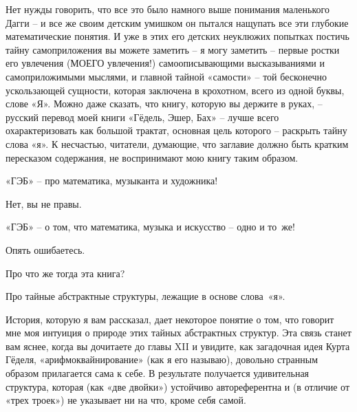 \documentclass[../main.tex]{subfiles}
\begin{document}
Нет нужды говорить, что все это было намного выше понимания маленького Дагги \--- и все же своим детским умишком он пытался нащупать все эти глубокие математические понятия. И уже в этих его детских неуклюжих попытках постичь тайну самоприложения вы можете заметить \--- я могу заметить \--- первые ростки его увлечения (МОЕГО увлечения!) самоописывающими высказываниями и самоприложимыми мыслями, и главной тайной «самости» \--- той бесконечно ускользающей сущности, которая заключена в крохотном, всего из одной буквы, слове «Я». Можно даже сказать, что книгу, которую вы держите в руках, \--- русский перевод моей книги «Гёдель, Эшер, Бах» \--- лучше всего охарактеризовать как большой трактат, основная цель которого \--- раскрыть тайну слова «я». К несчастью, читатели, думающие, что заглавие должно быть кратким пересказом содержания, не воспринимают мою книгу таким образом.

\begin{adjustwidth}{\parindent}{}
\begin{dialogue}
 «ГЭБ» \--- про математика, музыканта и художника!

 Нет, вы не правы.

 «ГЭБ» \--- о том, что математика, музыка и искусство \--- одно и то~же!

 Опять ошибаетесь.

 Про что же тогда эта книга?

 Про тайные абстрактные структуры, лежащие в основе слова~«я».
\end{dialogue}
\end{adjustwidth}

История, которую я вам рассказал, дает некоторое понятие о том, что говорит мне моя интуиция о природе этих тайных абстрактных структур. Эта связь станет вам яснее, когда вы дочитаете до главы XII и увидите, как загадочная идея Курта Гёделя, «арифмоквайнирование» (как я его называю), довольно странным образом прилагается сама к себе. В результате получается удивительная структура, которая (как «две двойки») устойчиво автореферентна и (в отличие от «трех троек») не указывает ни на что, кроме себя самой.
\end{document}
